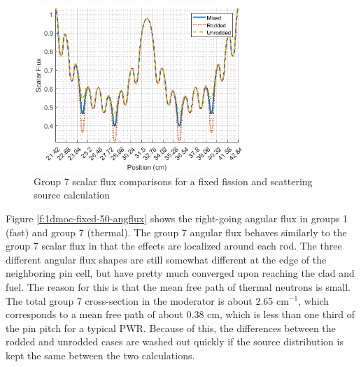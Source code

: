 \begin{figure}[H]
  \centering
  \includegraphics[width=0.7\textwidth]{../figs/1dmoc-50mix-fixedscat-scalflux7.png}
  \caption{Group 7 scalar flux comparisons for a fixed fission and scattering source calculation}\label{f:1dmoc-fixed-50-scalflux7}
\end{figure}

Figure \ref{f:1dmoc-fixed-50-angflux} shows the right-going angular flux in groups 1 (fast) and group 7 (thermal).  The group 7 angular flux behaves similarly to the group 7 scalar flux in that the effects are localized around each rod.  The three different angular flux shapes are still somewhat different at the edge of the neighboring pin cell, but have pretty much converged upon reaching the clad and fuel.  The reason for this is that the mean free path of thermal neutrons is small.  The total group 7 cross-section in the moderator is about 2.65 cm$^{-1}$, which corresponds to a mean free path of about 0.38 cm, which is less than one third of the pin pitch for a typical PWR.  Because of this, the differences between the rodded and unrodded cases are washed out quickly if the source distribution is kept the same between the two calculations.

